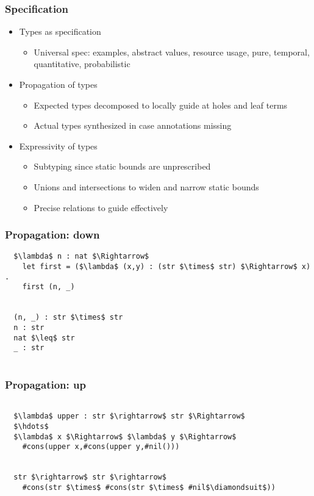 \documentclass{beamer}
\begin{document}
\begin{frame}[fragile]
  \frametitle{Specification}
  \begin{itemize}
  \item Types as specification 
    \begin{itemize}
    \item Universal spec: examples, abstract values, resource usage, 
      pure, temporal, quantitative, probabilistic 
    \end{itemize}
  \item Propagation of types   
    \begin{itemize}
    \item Expected types decomposed to locally guide at holes and leaf terms   
    \item Actual types synthesized in case annotations missing 
    \end{itemize}

  \item Expressivity of types    
    \begin{itemize}
    \item Subtyping since static bounds are unprescribed 
    \item Unions and intersections to widen and narrow static bounds 
    \item Precise relations to guide effectively   
    \end{itemize}
  \end{itemize}
\end{frame}

\begin{frame}[fragile]
  \frametitle{Propagation: down}

  \begin{lstlisting}
  $\lambda$ n : nat $\Rightarrow$
    let first = ($\lambda$ (x,y) : (str $\times$ str) $\Rightarrow$ x) .
    first (n, _) 

    
  (n, _) : str $\times$ str
  n : str   
  nat $\leq$ str 
  _ : str  
    

  \end{lstlisting}

\end{frame}

\begin{frame}[fragile]
  \frametitle{Propagation: up}

  \begin{lstlisting}

  $\lambda$ upper : str $\rightarrow$ str $\Rightarrow$
  $\hdots$
  $\lambda$ x $\Rightarrow$ $\lambda$ y $\Rightarrow$
    #cons(upper x,#cons(upper y,#nil()))


  str $\rightarrow$ str $\rightarrow$
    #cons(str $\times$ #cons(str $\times$ #nil$\diamondsuit$))

  \end{lstlisting}

\end{frame}
\end{document}
